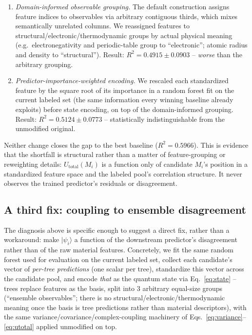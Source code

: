 \documentclass[conference]{IEEEtran}
\begin{document}
\begin{enumerate}
    \item \emph{Domain-informed observable grouping.} The default construction assigns feature indices to observables via arbitrary contiguous thirds, which mixes semantically unrelated columns. We reassigned features to structural/electronic/thermodynamic groups by actual physical meaning (e.g.\ electronegativity and periodic-table group to ``electronic''; atomic radius and density to ``structural''). Result: $R^2=0.4915\pm0.0903$ -- \emph{worse} than the arbitrary grouping.
    \item \emph{Predictor-importance-weighted encoding.} We rescaled each standardized feature by the square root of its importance in a random forest fit on the current labeled set (the same information every winning baseline already exploits) before state encoding, on top of the domain-informed grouping. Result: $R^2=0.5124\pm0.0773$ -- statistically indistinguishable from the unmodified original.
\end{enumerate}

Neither change closes the gap to the best baseline ($R^2=0.5966$). This is evidence that the shortfall is structural rather than a matter of feature-grouping or reweighting details: $U_{\mathrm{total}}(M_i)$ is a function only of candidate $M_i$'s position in a standardized feature space and the labeled pool's correlation structure. It never observes the trained predictor's residuals or disagreement.

\subsection{A third fix: coupling to ensemble disagreement}\label{sec:v3}

The diagnosis above is specific enough to suggest a direct fix, rather than a workaround: make $|\psi_i\rangle$ a function of the downstream predictor's disagreement rather than of the raw material features. Concretely, we fit the same random forest used for evaluation on the current labeled set, collect each candidate's vector of \emph{per-tree predictions} (one scalar per tree), standardize this vector across the candidate pool, and encode \emph{that} as the quantum state via Eq.~\eqref{eq:state} -- trees replace features as the basis, split into 3 arbitrary equal-size groups (``ensemble observables''; there is no structural/electronic/thermodynamic meaning once the basis is tree predictions rather than material descriptors), with the same variance/covariance/complex-coupling machinery of Eqs.~\eqref{eq:variance}--\eqref{eq:utotal} applied unmodified on top.
\end{document}
